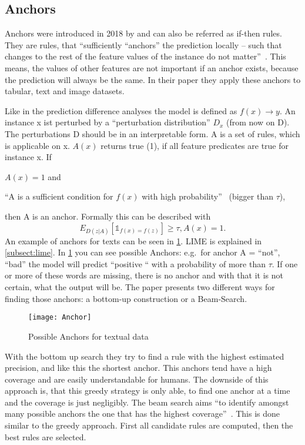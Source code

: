 \subsection{Anchors}
Anchors were introduced in 2018 by  and can also be referred as if-then rules. They are rules, that “sufficiently “anchors” the prediction locally – such that changes to the rest of the feature values of the instance do not matter”~\cite[1]{Ribeiro.2018}. This means, the values of other features are not important if an anchor exists, because the prediction will always be the same. In their paper they apply these anchors to tabular, text and image datasets.
\par
Like in the prediction difference analyses the model is defined as  
\(f(x) \rightarrow y\). 
An instance x ist perturbed by a “perturbation distribution” \(D_{x}\) (from now on D). The perturbations D should be in an interpretable form. A is a set of rules, which is applicable on x. \(A(x)\) returns true (1), if all feature predicates are true for instance x.
If
\begin{enumerate*}[label={\roman*)}]
    \item \(A(x) = 1\) and
    \item “A is a sufficient condition for \(f(x)\) with high probability”~\cite[2]{Ribeiro.2018} (bigger than \(\tau\)),
\end{enumerate*}
then A is an anchor. Formally this can be described with 
\[
    E_{D(z|A)} [\mathbb{1}_{f(x)=f(z)}] ≥ \tau, A(x) = 1.
\]
An example of anchors for texts can be seen in \cref{fig:Anchor}. LIME is explained in \cref{subsect:lime}. In \cref{fig:Anchor} you can see possible Anchors: e.g.\ for anchor A = {“not”, “bad”} the model will predict “positive “ with a probability of more than \(\tau\). If one or more of these words are missing, there is no anchor and with that it is not certain, what the output will be.
The paper presents two different ways for finding those anchors: a bottom-up construction or a Beam-Search.
\begin{figure}
    \center{}
    \texttt{[image: Anchor]}
    \caption{Possible Anchors for textual data~\cite{Ribeiro.2018}}\label{fig:Anchor}
\end{figure}
\par
With the bottom up search they try to find a rule with the highest estimated precision, and like this the shortest anchor. This anchors tend have a high coverage and are easily understandable for humans. 
The downside of this approach is, that this greedy strategy is only able, to find one anchor at a time and the coverage is just negligibly.
The beam search aims “to identify amongst many possible anchors the one that has the highest coverage”~\cite[5]{Ribeiro.2018}. This is done similar to the greedy approach. First all candidate rules are computed, then the best rules are selected.

